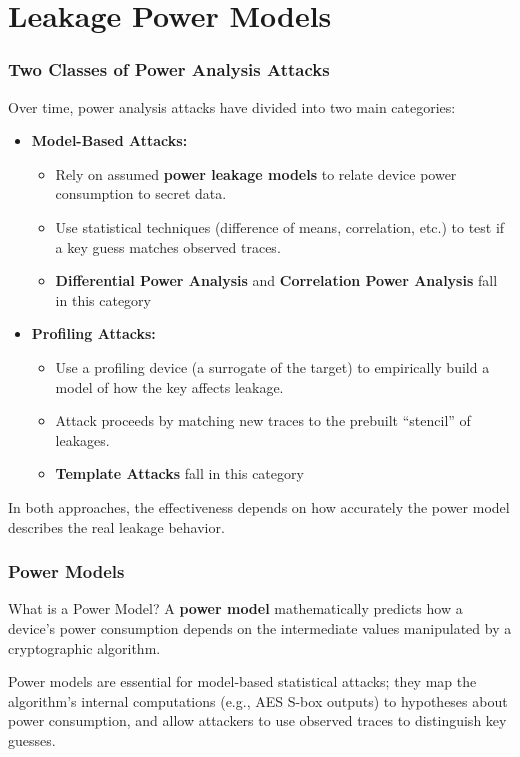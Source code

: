 \section{Leakage Power Models}

\begin{frame}
    \frametitle{Two Classes of Power Analysis Attacks}

    Over time, power analysis attacks have divided into two main categories:

    \begin{itemize}
        \item \textbf{Model-Based Attacks:}
        \begin{itemize}
            \item Rely on assumed \textbf{power leakage models} to relate device power consumption to secret data.
            \item Use statistical techniques (difference of means, correlation, etc.) to test if a key guess matches observed traces.
            \item \textbf{Differential Power Analysis} and \textbf{Correlation Power Analysis} fall in this category
        \end{itemize}
        \item \textbf{Profiling Attacks:}
        \begin{itemize}
            \item Use a profiling device (a surrogate of the target) to empirically build a model of how the key affects leakage.
            \item Attack proceeds by matching new traces to the prebuilt “stencil” of leakages.
            \item \textbf{Template Attacks} fall in this category
        \end{itemize}
    \end{itemize}

    In both approaches, the effectiveness depends on how accurately the power model describes the real leakage behavior.
\end{frame}

\begin{frame}
    \frametitle{Power Models}

    \begin{block}{What is a Power Model?}
        A \textbf{power model} mathematically predicts how a device’s power consumption depends on the intermediate values manipulated by a cryptographic algorithm.
    \end{block}

    \vspace{0.5em}

    Power models are essential for model-based statistical attacks; they map the algorithm’s internal computations (e.g., AES S-box outputs) to hypotheses about power consumption, and allow attackers to use observed traces to distinguish key guesses.
\end{frame}

